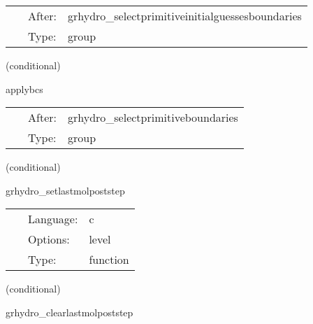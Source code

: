 \documentclass{article}
\begin{document}
\hspace{5mm}{\it apply boundary conditions to initial guess primitive variables } 


\hspace{5mm}

 \begin{tabular*}{160mm}{cll} 
~ & After:  & grhydro\_selectprimitiveinitialguessesboundaries \\ 
~ & Type:  & group \\ 
\end{tabular*} 


\vspace{5mm}

   (conditional) 

\hspace{5mm} applybcs 

\hspace{5mm}{\it apply boundary conditions to all primitive variables } 


\hspace{5mm}

 \begin{tabular*}{160mm}{cll} 
~ & After:  & grhydro\_selectprimitiveboundaries \\ 
~ & Type:  & group \\ 
\end{tabular*} 


\vspace{5mm}

   (conditional) 

\hspace{5mm} grhydro\_setlastmolpoststep 

\hspace{5mm}{\it set grid scalar inlastmolpoststep if this is the last mol poststep call } 


\hspace{5mm}

 \begin{tabular*}{160mm}{cll} 
~ & Language:  & c \\ 
~ & Options:  & level \\ 
~ & Type:  & function \\ 
\end{tabular*} 


\vspace{5mm}

   (conditional) 

\hspace{5mm} grhydro\_clearlastmolpoststep 
\end{document}
